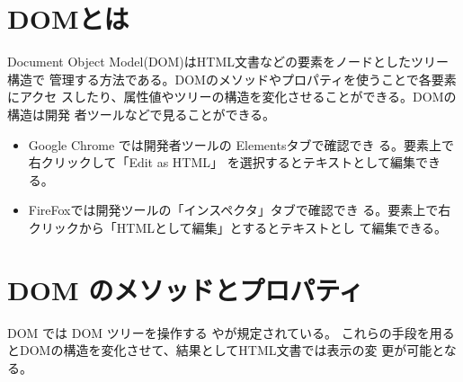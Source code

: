 \section{DOMとは}
Document Object Model(DOM)はHTML文書などの要素をノードとしたツリー構造で
管理する方法である。DOMのメソッドやプロパティを使うことで各要素にアクセ
スしたり、属性値やツリーの構造を変化させることができる。DOMの構造は開発
者ツールなどで見ることができる。
\begin{itemize}
 \item Google Chrome では開発者ツールの Elementsタブで確認でき
       る。要素上で右クリックして「Edit as HTML」
       を選択するとテキストとして編集できる。
 \item FireFoxでは開発ツールの「インスペクタ」タブで確認でき
       る。要素上で右クリックから「HTMLとして編集」とするとテキストとし
       て編集できる。 
\end{itemize}
\newcommand{\DOMM}{\texttt}
\newcommand{\DOMP}{\texttt}
\newcommand{\DOM}{\texttt{DOM}}
\newcommand{\keyitem}{\relax}
\newcommand{\HTML}{HTML文書}
\section{DOM のメソッドとプロパティ}
DOM では DOM ツリーを操作する%
\keyitem{メソッド}や\keyitem{プロパティ}が規定されている。
これらの手段を用るとDOMの構造を変化させて、結果として\HTML では表示の変
更が可能となる。
\iffalse
 メソッド%
 では次のようなものあがある。
\begin{itemize}
 \item 条件に合う要素または要素のリストを得る。
 \item 要素の属性の参照、変更ができる。
 \item 要素を新規に作成する。
 \item ある要素に子要素を追加したり、取り除いたりする。
\end{itemize}
プロパティはそのオブジェクトが持つ性質であり、それらの値を参照できる。ほ
とんどのプロパティは書き直しできない。
\fi
\iffalse
なお、ここでのメソッドやプロパティは DOM文書で使用可能なものである。したがっ
て、\HTML も \DOM{} をサポートするブラウザであれば同様の方法で
部分的に書き直すことが可能である。
\fi
